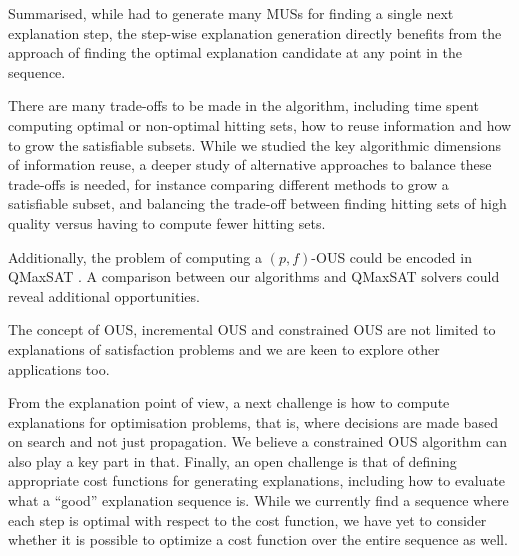 
Summarised, while \citet{ecai/BogaertsGCG20} had to generate many MUSs for finding a single next explanation step, the step-wise explanation generation directly benefits from the \comus approach of finding the optimal explanation candidate at any point in the sequence.

There are many trade-offs to be made in the algorithm, including time spent computing optimal or non-optimal hitting sets, how to reuse information and how to grow the satisfiable subsets. While we studied the key algorithmic dimensions of information reuse, a deeper study of alternative approaches to balance these trade-offs is needed, for instance comparing different methods to grow a satisfiable subset, and balancing the trade-off between finding hitting sets of high quality versus having to compute fewer hitting sets.

Additionally, the problem of computing a $(p,f)$-OUS could be encoded in QMaxSAT \cite{DBLP:journals/constraints/IgnatievJM16}. A  comparison between our algorithms and QMaxSAT solvers could reveal additional opportunities.

The concept of OUS, incremental OUS and constrained OUS are not limited to explanations of satisfaction problems and we are keen to explore other applications too.

From the explanation point of view, a next challenge is how to compute explanations for optimisation problems, that is, where decisions are made based on search and not just propagation. We believe a constrained OUS algorithm can also play a key part in that. Finally, an open challenge is that of defining appropriate cost functions for generating explanations, including how to evaluate what a ``good'' explanation sequence is. While we currently find a sequence where each step is optimal with respect to the cost function, we have yet to consider whether it is possible to optimize a cost function over the entire sequence as well.

